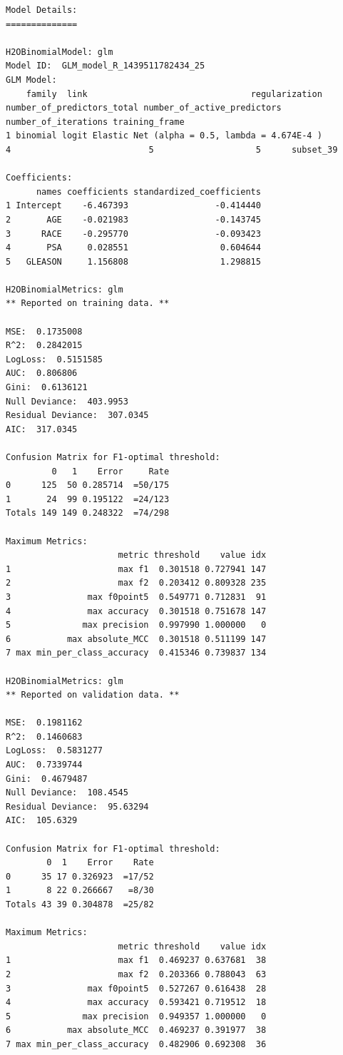 \waterExampleInR

\waterExampleInPython

\newpage
\begin{lstlisting}[style=output]
Model Details:
==============

H2OBinomialModel: glm
Model ID:  GLM_model_R_1439511782434_25 
GLM Model:
    family  link                                regularization number_of_predictors_total number_of_active_predictors number_of_iterations training_frame
1 binomial logit Elastic Net (alpha = 0.5, lambda = 4.674E-4 )                          4                           5                    5      subset_39

Coefficients:
      names coefficients standardized_coefficients
1 Intercept    -6.467393                 -0.414440
2       AGE    -0.021983                 -0.143745
3      RACE    -0.295770                 -0.093423
4       PSA     0.028551                  0.604644
5   GLEASON     1.156808                  1.298815

H2OBinomialMetrics: glm
** Reported on training data. **

MSE:  0.1735008
R^2:  0.2842015
LogLoss:  0.5151585
AUC:  0.806806
Gini:  0.6136121
Null Deviance:  403.9953
Residual Deviance:  307.0345
AIC:  317.0345

Confusion Matrix for F1-optimal threshold:
         0   1    Error     Rate
0      125  50 0.285714  =50/175
1       24  99 0.195122  =24/123
Totals 149 149 0.248322  =74/298

Maximum Metrics:
                      metric threshold    value idx
1                     max f1  0.301518 0.727941 147
2                     max f2  0.203412 0.809328 235
3               max f0point5  0.549771 0.712831  91
4               max accuracy  0.301518 0.751678 147
5              max precision  0.997990 1.000000   0
6           max absolute_MCC  0.301518 0.511199 147
7 max min_per_class_accuracy  0.415346 0.739837 134

H2OBinomialMetrics: glm
** Reported on validation data. **

MSE:  0.1981162
R^2:  0.1460683
LogLoss:  0.5831277
AUC:  0.7339744
Gini:  0.4679487
Null Deviance:  108.4545
Residual Deviance:  95.63294
AIC:  105.6329

Confusion Matrix for F1-optimal threshold:
        0  1    Error    Rate
0      35 17 0.326923  =17/52
1       8 22 0.266667   =8/30
Totals 43 39 0.304878  =25/82

Maximum Metrics:
                      metric threshold    value idx
1                     max f1  0.469237 0.637681  38
2                     max f2  0.203366 0.788043  63
3               max f0point5  0.527267 0.616438  28
4               max accuracy  0.593421 0.719512  18
5              max precision  0.949357 1.000000   0
6           max absolute_MCC  0.469237 0.391977  38
7 max min_per_class_accuracy  0.482906 0.692308  36
\end{lstlisting}

